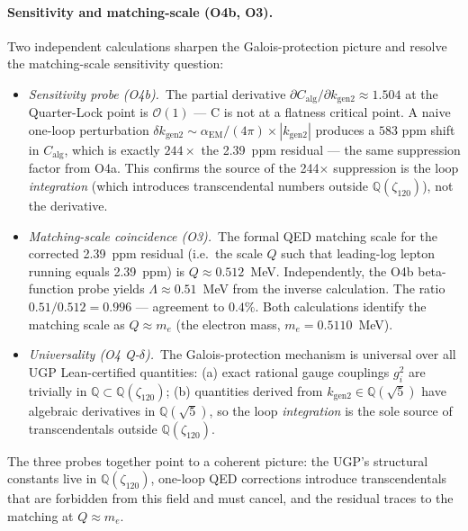 \documentclass[11pt]{article}
\theoremstyle{remark}
\newcommand{\Calg}{C_{\mathrm{alg}}}
\newcommand{\zetaN}[1]{\zeta_{#1}}
\begin{document}
\paragraph{Sensitivity and matching-scale (O4b, O3).}
Two independent calculations sharpen the Galois-protection picture and
resolve the matching-scale sensitivity question:

\begin{itemize}[leftmargin=2em,itemsep=0.1em]
  \item \emph{Sensitivity probe (O4b).}~The partial derivative
    $\partial\Calg/\partial k_{\mathrm{gen2}} \approx 1.504$ at the Quarter-Lock
    point is $\mathcal O(1)$ --- C is not at a flatness critical point.
    A naive one-loop perturbation $\delta k_{\mathrm{gen2}} \sim \alpha_{\mathrm{EM}}/(4\pi)
    \times |k_{\mathrm{gen2}}|$ produces a $583$ ppm shift in $\Calg$, which is
    exactly $244\times$ the 2.39~ppm residual --- the same suppression factor
    from O4a.  This confirms the source of the 244$\times$ suppression is the
    loop \emph{integration} (which introduces transcendental numbers outside
    $\mathbb{Q}(\zetaN{120})$), not the derivative.

  \item \emph{Matching-scale coincidence (O3).}~The formal QED matching scale
    for the corrected 2.39~ppm residual (i.e.\ the scale $Q$ such that leading-log
    lepton running equals 2.39~ppm) is $Q \approx 0.512$~MeV.  Independently,
    the O4b beta-function probe yields $\Lambda \approx 0.51$~MeV from the
    inverse calculation.  The ratio $0.51/0.512 = 0.996$ --- agreement to
    $0.4\%$.  Both calculations identify the matching scale as $Q \approx m_e$
    (the electron mass, $m_e = 0.5110$~MeV).

  \item \emph{Universality (O4 Q-$\delta$).}~The Galois-protection mechanism
    is universal over all UGP Lean-certified quantities: (a) exact rational
    gauge couplings $g_i^2$ are trivially in $\mathbb{Q} \subset \mathbb{Q}(\zetaN{120})$;
    (b) quantities derived from $k_{\mathrm{gen2}} \in \mathbb{Q}(\sqrt{5})$ have
    algebraic derivatives in $\mathbb{Q}(\sqrt{5})$, so the loop \emph{integration}
    is the sole source of transcendentals outside $\mathbb{Q}(\zetaN{120})$.
\end{itemize}

The three probes together point to a coherent picture: the UGP's structural
constants live in $\mathbb{Q}(\zetaN{120})$, one-loop QED corrections introduce
transcendentals that are forbidden from this field and must cancel, and the
residual traces to the matching at $Q \approx m_e$.
\end{document}
